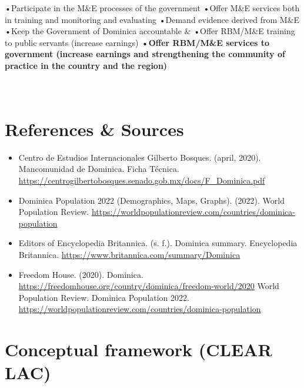 \documentclass[
  10pt,
]{book}
\begin{document}
\begin{table}
\begin{tabu}
•Participate in the M\&E processes of the government
•Offer M\&E services both in training and monitoring and evaluating
•Demand evidence derived from M\&E
•Keep the Government of Dominica accountable & •Offer RBM/M\&E training to public servants (increase earnings)
\textbf{•Offer RBM/M\&E services to government (increase earnings and strengthening the community of practice in the country and the region)}\\
\hline
{}\\
\\
\end{tabu}
\end{table}

\hypertarget{references-sources}{%
\chapter*{References \& Sources}\label{references-sources}}

\begin{itemize}
\item
  Centro de Estudios Internacionales Gilberto Bosques. (april, 2020). Mancomunidad de Dominica. Ficha Técnica. \url{https://centrogilbertobosques.senado.gob.mx/docs/F_Dominica.pdf}
\item
  Dominica Population 2022 (Demographics, Maps, Graphs). (2022). World Population Review. \url{https://worldpopulationreview.com/countries/dominica-population}
\item
  Editors of Encyclopedia Britannica. (s. f.). Dominica summary. Encyclopedia Britannica. \url{https://www.britannica.com/summary/Dominica}
\item
  Freedom House. (2020). Dominica. \url{https://freedomhouse.org/country/dominica/freedom-world/2020}
  World Population Review. Dominica Population 2022. \url{https://worldpopulationreview.com/countries/dominica-population}
\end{itemize}

\hypertarget{appendix-appendix}{%
\appendix}


\hypertarget{appendixA}{%
\chapter{Conceptual framework (CLEAR LAC)}\label{appendixA}}
\end{document}
